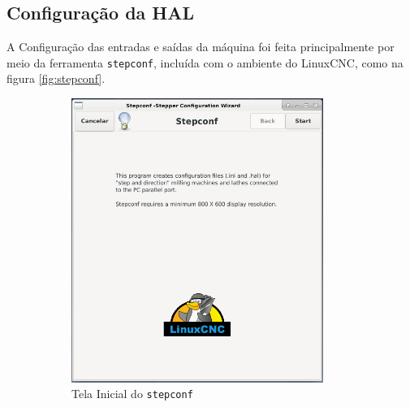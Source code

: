 \documentclass[
	article,			%
	11pt,				%
	oneside,			%
	a4paper,			%
	section=TITLE,		%
	english,			%
	brazil,				%
	sumario=tradicional
	]{abntex2}
\newcommand{\LCNC}{LinuxCNC}
\newcommand{\stepconf}{\texttt{stepconf}}
\begin{document}
\newpage
\subsection{Configuração da HAL}

A Configuração das entradas e saídas da máquina foi feita principalmente por meio da ferramenta \texttt{stepconf}, incluída com o ambiente do \LCNC, como na figura \ref{fig:stepconf}.

\begin{figure}[H]

    \centering
    \begin{subfigure}[b]{0.5\textwidth}
        \centering
        \includegraphics[width=0.9\textwidth]{img/stepconf_start.png}
        \caption{Tela Inicial do \stepconf}
        \label{fig:stepconf-start}
    \end{subfigure}%
    \begin{subfigure}[b]{0.5\textwidth}
        \centering

\end{subfigure}
\end{figure}
\end{document}
